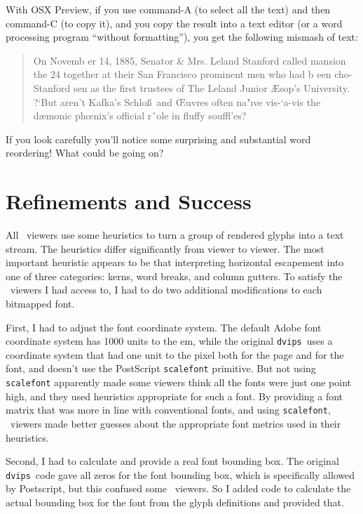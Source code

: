 \documentclass{ltugboat}
\def\PDF{\acro{PDF}}
\def\dvips{\texttt{dvips}}
\begin{document}
With OSX Preview, if you use command-A
(to select all the text) and then command-C (to copy
it), and you copy the result into a text editor (or
a word processing program ``without formatting''),
you get the following mismash of text:

\begin{quote}
On Novemb er 14, 1885, Senator \& Mrs. Leland
Stanford called
mansion the 24
together at their San Francisco
prominent men who had
b een cho-
Stanford
sen as the first trustees of The Leland
Junior
{\AE}sop’s
University. ?`But aren’t Kafka’s Schlo\ss\ and
{\OE}uvres often na"ıve vis-`a-vis the dæmonic
ph{\oe}nix’s official rˆole in fluffy souffl'es?
\end{quote}
\noindent
If you look carefully you'll notice some surprising
and substantial word reordering!  What could
be going on?

\section{Refinements and Success}

All \PDF\ viewers use some heuristics
to turn a group of rendered glyphs into a text stream.
The heuristics differ significantly from viewer to
viewer.  The most important heuristic appears to be
that interpreting horizontal escapement into one of
three categories: kerns, word breaks, and column
gutters.  To satisfy the \PDF\ viewers I had access to,
I had to do two additional modifications to each bitmapped
font.

First, I had to adjust the font coordinate system.
The default Adobe font coordinate system has 1000 units
to the em, while the original
\dvips\ uses a coordinate system that had one unit to the
pixel both for the page and for the font, and doesn't use
the PostScript \texttt{scalefont} primitive.  But not using
\texttt{scalefont} apparently made some viewers think all the
fonts were just one point high, and they used heuristics
appropriate for such a font.  By providing a font matrix
that was more in line with conventional fonts, and using
\texttt{scalefont}, \PDF\ viewers made better guesses about
the appropriate font metrics used in their heuristics.

Second, I had to calculate and provide a real font bounding
box.  The original \dvips\ code gave all zeros for the font
bounding box, which is specifically allowed by Postscript,
but this confused some \PDF\ viewers.  So I added code to
calculate the actual bounding box for the font from the
glyph definitions and provided that.
\end{document}
